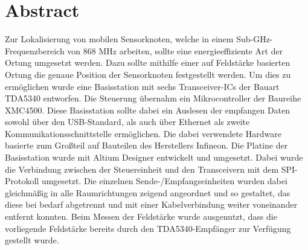 \newpage
\chapter*{Abstract}
\label{sec:abstract}
\pagestyle{scrheadings}

Zur Lokalisierung von mobilen Sensorknoten, welche in einem Sub-GHz-Frequenzbereich von 868 MHz arbeiten, sollte eine energieeffiziente Art der Ortung umgesetzt werden. Dazu sollte mithilfe einer auf Feldstärke basierten Ortung die genaue Position der Sensorknoten festgestellt werden. Um dies zu ermöglichen wurde eine Basisstation mit sechs Transceiver-ICs der Bauart TDA5340 entworfen. Die Steuerung übernahm ein Mikrocontroller der Baureihe XMC4500. Diese Basisstation sollte dabei ein Auslesen der empfangen Daten  sowohl über den USB-Standard, als auch über Ethernet als zweite Kommunikationsschnittstelle ermöglichen. Die dabei verwendete Hardware basierte zum Großteil auf Bauteilen des Herstellers Infineon. 
Die Platine der Basisstation wurde mit Altium Designer entwickelt und umgesetzt. Dabei wurde die  Verbindung zwischen der Steuereinheit und den Transceivern mit dem SPI-Protokoll umgesetzt. Die einzelnen Sende-/Empfangseinheiten wurden dabei gleichmäßig in alle Raumrichtungen zeigend angeordnet und so gestaltet, das diese bei bedarf abgetrennt und mit einer Kabelverbindung weiter voneinander entfernt konnten.
Beim Messen der Feldstärke wurde ausgenutzt, dass die vorliegende Feldstärke bereits durch den TDA5340-Empfänger zur Verfügung gestellt wurde.
